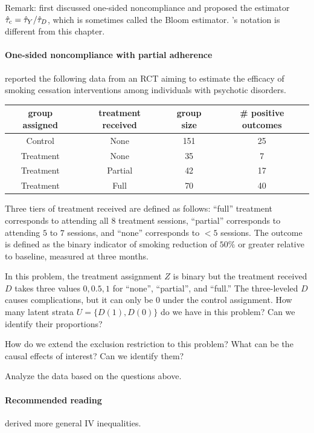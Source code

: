  
Remark: \citet{bloom1984accounting} first discussed one-sided noncompliance and proposed the estimator $\hat\tau_{\textup{c}} = \hat\tau_Y / \hat\tau_D$, which is sometimes called the Bloom estimator.  \citet{bloom1984accounting}'s notation is different from this chapter. 

 
 
 
 
  \paragraph{One-sided noncompliance with partial adherence}
\label{para::one-sided-partial-adherence}
 
\citet[][Table 3]{sanders2021incorporating} reported the following data from an RCT aiming to estimate the efficacy of smoking cessation interventions among individuals with psychotic disorders. 

\begin{center}
\begin{tabular}{cccc}
\hline  
group assigned& treatment received &group size& \# positive outcomes \\
\hline  
Control & None& 151 &25 \\
Treatment& None& 35 & 7 \\
Treatment& Partial& 42& 17 \\
Treatment& Full& 70& 40\\
\hline 
\end{tabular}
\end{center}

Three tiers of treatment received are defined as follows: ``full'' treatment corresponds to attending all $8$ treatment sessions, ``partial'' corresponds to attending $5$ to $7$ sessions, and ``none'' corresponds to $<5$ sessions. The outcome is
defined as the binary indicator of smoking reduction of $50\%$ or greater relative to baseline, measured at three months.


In this problem, the treatment assignment $Z$ is binary but the treatment received $D$ takes three values $0, 0.5, 1$ for ``none'', ``partial'', and ``full.''  The three-leveled $D$ causes complications, but it can only be 0 under the control assignment. How many latent strata $U = \{ D(1), D(0) \} $ do we have in this problem? Can we identify their proportions?

How do we extend the exclusion restriction to this problem? What can be the causal effects of interest? Can we identify them? 

Analyze the data based on the questions above. 



  

 \paragraph{Recommended reading}

\citet{balke1997bounds} derived more general IV inequalities. 

